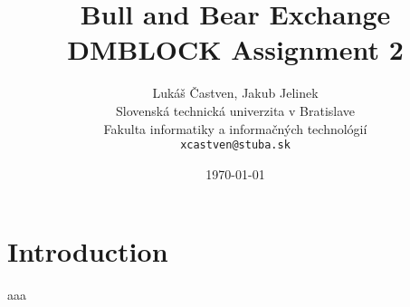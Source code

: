\documentclass[11pt,a4paper]{article}
\title{Bull and Bear Exchange\\
    \large DMBLOCK Assignment 2}
\author{Lukáš Častven, Jakub Jelinek\\[2pt]
	{\small Slovenská technická univerzita v Bratislave}\\
	{\small Fakulta informatiky a informačných technológií}\\
	{\small \texttt{xcastven@stuba.sk}}
}
\date{\today}
\begin{document}
\pagestyle{plain}

\maketitle
\tableofcontents
\pagebreak

\section{Introduction}

aaa\cite{uniswapDocs}
\lipsum[2-15]




\end{document}
